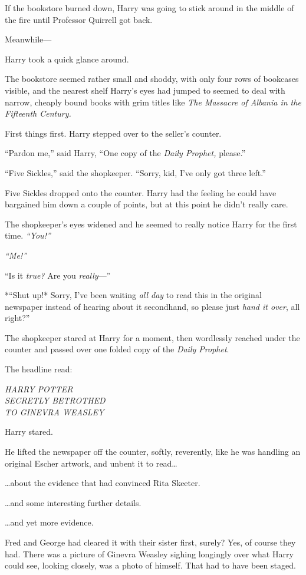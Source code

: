 If the bookstore burned down, Harry was going to stick around in the
middle of the fire until Professor Quirrell got back.

Meanwhile---

Harry took a quick glance around.

The bookstore seemed rather small and shoddy, with only four rows of
bookcases visible, and the nearest shelf Harry's eyes had jumped to
seemed to deal with narrow, cheaply bound books with grim titles like
\emph{The Massacre of Albania in the Fifteenth Century.}

First things first. Harry stepped over to the seller's counter.

``Pardon me,'' said Harry, ``One copy of the \emph{Daily Prophet,}
please.''

``Five Sickles,'' said the shopkeeper. ``Sorry, kid, I've only got three
left.''

Five Sickles dropped onto the counter. Harry had the feeling he could
have bargained him down a couple of points, but at this point he didn't
really care.

The shopkeeper's eyes widened and he seemed to really notice Harry for
the first time. \emph{``You!''}

\emph{``Me!''}

``Is it \emph{true?} Are you \emph{really}---''

*``Shut up!* Sorry, I've been waiting \emph{all day} to read this in the
original newspaper instead of hearing about it secondhand, so please
just \emph{hand it over}, all right?''

The shopkeeper stared at Harry for a moment, then wordlessly reached
under the counter and passed over one folded copy of the \emph{Daily
Prophet}.

The headline read:

\emph{HARRY POTTER}\\\emph{SECRETLY BETROTHED}\\\emph{TO GINEVRA
WEASLEY}

Harry stared.

He lifted the newspaper off the counter, softly, reverently, like he was
handling an original Escher artwork, and unbent it to read\ldots{}

\ldots{}about the evidence that had convinced Rita Skeeter.

\ldots{}and some interesting further details.

\ldots{}and yet more evidence.

Fred and George had cleared it with their sister first, surely? Yes, of
course they had. There was a picture of Ginevra Weasley sighing
longingly over what Harry could see, looking closely, was a photo of
himself. That had to have been staged.

